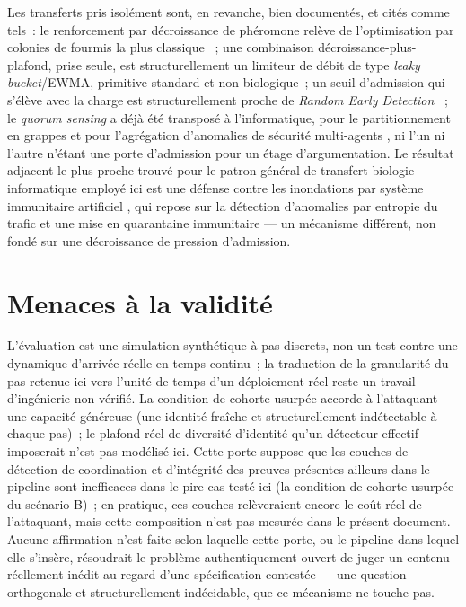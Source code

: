 \documentclass[11pt]{article}
\begin{document}
Les transferts pris isolément sont, en revanche, bien documentés, et
cités comme tels~: le renforcement par décroissance de phéromone relève
de l'optimisation par colonies de fourmis la plus classique
\cite{dorigo2004,dicaro1998}~; une combinaison décroissance-plus-plafond,
prise seule, est structurellement un limiteur de débit de type
\emph{leaky bucket}/EWMA, primitive standard et non biologique~; un seuil
d'admission qui s'élève avec la charge est structurellement proche de
\emph{Random Early Detection} \cite{floyd1993}~; le \emph{quorum sensing}
a déjà été transposé à l'informatique, pour le partitionnement en
grappes \cite{wang2013} et pour l'agrégation d'anomalies de sécurité
multi-agents \cite{fioravanti2012}, ni l'un ni l'autre n'étant une porte
d'admission pour un étage d'argumentation. Le résultat adjacent le plus
proche trouvé pour le patron général de transfert biologie-informatique
employé ici est une défense contre les inondations par système immunitaire
artificiel \cite{aiartnet2024}, qui repose sur la détection d'anomalies par
entropie du trafic et une mise en quarantaine immunitaire --- un
mécanisme différent, non fondé sur une décroissance de pression
d'admission.

\section{Menaces à la validité}
\label{sec:threats}

L'évaluation est une simulation synthétique à pas discrets, non un test
contre une dynamique d'arrivée réelle en temps continu~; la traduction de
la granularité du pas retenue ici vers l'unité de temps d'un déploiement
réel reste un travail d'ingénierie non vérifié. La condition de cohorte
usurpée accorde à l'attaquant une capacité généreuse (une identité
fraîche et structurellement indétectable à chaque pas)~; le plafond réel
de diversité d'identité qu'un détecteur effectif imposerait n'est pas
modélisé ici. Cette porte suppose que les couches de détection de
coordination et d'intégrité des preuves présentes ailleurs dans le
pipeline sont inefficaces dans le pire cas testé ici (la condition de
cohorte usurpée du scénario B)~; en pratique, ces couches relèveraient
encore le coût réel de l'attaquant, mais cette composition n'est pas
mesurée dans le présent document. Aucune affirmation n'est faite selon
laquelle cette porte, ou le pipeline dans lequel elle s'insère, résoudrait
le problème authentiquement ouvert de juger un contenu réellement inédit
au regard d'une spécification contestée --- une question orthogonale et
structurellement indécidable, que ce mécanisme ne touche pas.
\end{document}
